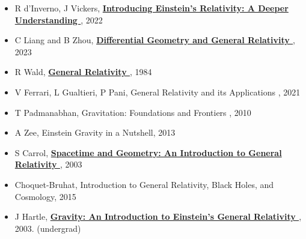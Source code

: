 \begin{itemize}[]

	\item[
		\href{run:C:/Users/verci/Documents/Reference Books/Physics/Introducing Einsteins Relativity A Deeper Understanding (Second edition) [d'Inverno, Vickers].pdf
	}{$\blacksquare$}
	]
	R d’Inverno, J Vickers,
	\textbf{\href{https://article.sk/book/Xgvb0ynOge/introducing-einsteins-relativity-a-deeper-understanding-second-edition.html
	}{
		Introducing Einstein’s Relativity: A Deeper Understanding%
	}}, 2022

	\item[
		\href{run:C:/Users/verci/Documents/Reference Books/Physics/Differential Geometry and General Relativity [Liang, Zhou].pdf
		}{$\blacksquare$}
	]
	C Liang and B Zhou,
	\textbf{\href{https://article.sk/book/92rXveVKgv/differential-geometry-and-general-relativity-volume-1.html
	}{
		Differential Geometry and General Relativity%
	}}, 2023

	\item[
		\href{run:C:/Users/verci/Documents/Reference Books/Physics/General Relativity [Wald].pdf
		}{$\blacksquare$}
	]
	R Wald,
	\textbf{\href{https://article.sk/book/9gkDMQrXjm/general-relativity.html
	}{
		General Relativity%
	}}, 1984

	\item[
		$\blacksquare$
	]
	V Ferrari, L Gualtieri, P Pani,
	General Relativity and its Applications%
	, 2021

	\item[
		$\blacksquare$
	]
	T Padmanabhan,
	Gravitation: Foundations and Frontiers%
	, 2010

	\item[
		$\blacksquare$
	]
	A Zee,
	Einstein Gravity in a Nutshell,
	2013

	\item[
		\href{run:C:/Users/verci/Documents/Reference Books/Physics/Spacetime and Geometry [Carrol].pdf
		}{$\blacksquare$}
	]
	S Carrol,
	\textbf{
		\href{https://article.sk/book/Yv2wkYWZ2p/spacetime-and-geometry-an-introduction-to-general-relativity.html
	}{
		Spacetime and Geometry: An Introduction to General Relativity%
	}}, 2003

	\item[
		$\blacksquare$
	]
	Choquet-Bruhat,
	Introduction to General Relativity, Black Holes, and Cosmology,
	2015

	\item[
		$\blacksquare$
	]
	J Hartle,
	\textbf{
		\href{https://article.sk/book/KV2VXKdegp/gravity-an-introduction-to-einsteins-general-relativity.html
		}{
			Gravity: An Introduction to Einstein’s General Relativity%
		}}, 2003. (undergrad)


\end{itemize}
